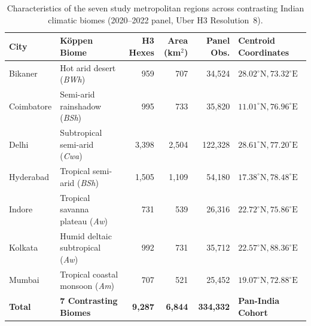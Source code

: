 \begin{table}[t]
\centering
\small
\caption{Characteristics of the seven study metropolitan regions across contrasting Indian climatic biomes (2020--2022 panel, Uber H3 Resolution~8).}
\label{tab:city_biomes}
\begin{tabularx}{\textwidth}{@{}l X r r r l@{}}
\toprule
\textbf{City} & \textbf{K{\"o}ppen Biome} & \textbf{H3 Hexes} & \textbf{Area (km$^2$)} & \textbf{Panel Obs.} & \textbf{Centroid Coordinates} \\
\midrule
Bikaner & Hot arid desert (\textit{BWh}) & 959 & 707 & 34,524 & $28.02^\circ\text{N}, 73.32^\circ\text{E}$ \\
Coimbatore & Semi-arid rainshadow (\textit{BSh}) & 995 & 733 & 35,820 & $11.01^\circ\text{N}, 76.96^\circ\text{E}$ \\
Delhi & Subtropical semi-arid (\textit{Cwa}) & 3,398 & 2,504 & 122,328 & $28.61^\circ\text{N}, 77.20^\circ\text{E}$ \\
Hyderabad & Tropical semi-arid (\textit{BSh}) & 1,505 & 1,109 & 54,180 & $17.38^\circ\text{N}, 78.48^\circ\text{E}$ \\
Indore & Tropical savanna plateau (\textit{Aw}) & 731 & 539 & 26,316 & $22.72^\circ\text{N}, 75.86^\circ\text{E}$ \\
Kolkata & Humid deltaic subtropical (\textit{Aw}) & 992 & 731 & 35,712 & $22.57^\circ\text{N}, 88.36^\circ\text{E}$ \\
Mumbai & Tropical coastal monsoon (\textit{Am}) & 707 & 521 & 25,452 & $19.07^\circ\text{N}, 72.88^\circ\text{E}$ \\
\midrule
\textbf{Total} & \textbf{7 Contrasting Biomes} & \textbf{9,287} & \textbf{6,844} & \textbf{334,332} & \textbf{Pan-India Cohort} \\
\bottomrule
\end{tabularx}
\end{table}
